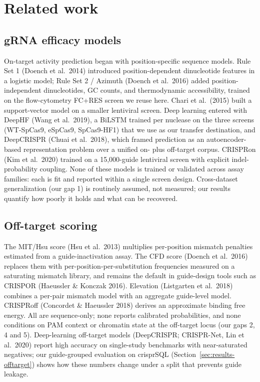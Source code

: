 \section{Related work}
\label{sec:related}

\subsection{gRNA efficacy models}
On-target activity prediction began with position-specific sequence models.
Rule Set 1 (Doench et al.\ 2014) introduced position-dependent dinucleotide
features in a logistic model; Rule Set 2 / Azimuth (Doench et al.\ 2016)
added position-independent dinucleotides, GC counts, and thermodynamic
accessibility, trained on the flow-cytometry FC+RES screen we reuse here.
Chari et al.\ (2015) built a support-vector model on a smaller
lentiviral screen. Deep learning entered with DeepHF (Wang et al.\ 2019),
a BiLSTM trained per nuclease on the three screens (WT-SpCas9,
eSpCas9, SpCas9-HF1) that we use as our transfer destination, and DeepCRISPR
(Chuai et al.\ 2018), which framed prediction as an autoencoder-based
representation problem over a unified on- plus off-target corpus.
CRISPRon (Kim et al.\ 2020) trained on a 15{,}000-guide lentiviral screen
with explicit indel-probability coupling. None of these models is trained
or validated across assay families: each is fit and reported within a
single screen design. Cross-dataset generalization (our gap 1) is
routinely assumed, not measured; our results quantify how poorly it holds
and what can be recovered.

\subsection{Off-target scoring}
The MIT/Hsu score (Hsu et al.\ 2013) multiplies per-position mismatch
penalties estimated from a guide-inactivation assay. The CFD score
(Doench et al.\ 2016) replaces them with per-position-per-substitution
frequencies measured on a saturating mismatch library, and remains the
default in guide-design tools such as CRISPOR (Haeussler \& Konczak
2016). Elevation (Listgarten et al.\ 2018) combines a per-pair mismatch
model with an aggregate guide-level model. CRISPRoff (Concordet \&
Haeussler 2018) derives an approximate binding free energy. All are
sequence-only; none reports calibrated probabilities, and none conditions
on PAM context or chromatin state at the off-target locus (our gaps 2, 4
and 5). Deep-learning off-target models (DeepCRISPR; CRISPR-Net, Lin et
al.\ 2020) report high accuracy on single-study benchmarks with
near-saturated negatives; our guide-grouped evaluation on crisprSQL
(Section~\ref{sec:results-offtarget}) shows how these numbers change
under a split that prevents guide leakage.

